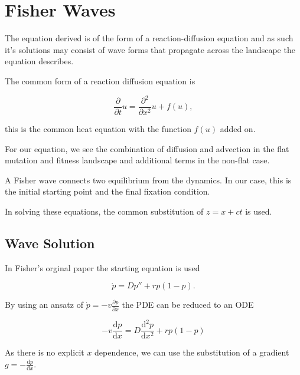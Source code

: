 \documentclass{standalone}
\begin{document}

\section{Fisher Waves}

The equation derived is of the form of a reaction-diffusion equation and as such it's solutions may consist of wave forms that propagate across the landscape the equation describes.

The common form of a  reaction diffusion equation is 

\begin{equation}
\frac{\partial}{\partial t} u = \frac{\partial ^2}{\partial x ^2} u + f(u) ,
\end{equation}

this is the common heat equation with the function $f(u)$ added on. 

For our equation, we see the combination of diffusion and advection in the flat mutation and fitness landscape and additional terms in the non-flat case. 

A Fisher wave connects two equilibrium from the dynamics. In our case, this is the initial starting point  and the final fixation condition. 

In solving these equations, the common substitution of $z = x + ct$ is used. 

\subsection{Wave Solution}

In Fisher's orginal paper the starting equation is used

\begin{equation}
\dot{p} = Dp'' + rp(1-p). 
\end{equation}

By using an ansatz of $\dot{p} = - v \frac{\partial p }{\partial x} $ the PDE can be reduced to an ODE

\begin{equation}
- v \frac{\mathrm{d}p}{\mathrm{d} x}  = D \frac{\mathrm{d} ^2 p}{\mathrm{d} x ^2} + rp(1-p)
\end{equation}

As there is no explicit $x$ dependence, we can use the substitution of a gradient $g = - \frac{\mathrm{d} p}{\mathrm{d} x}$.
\end{document}

